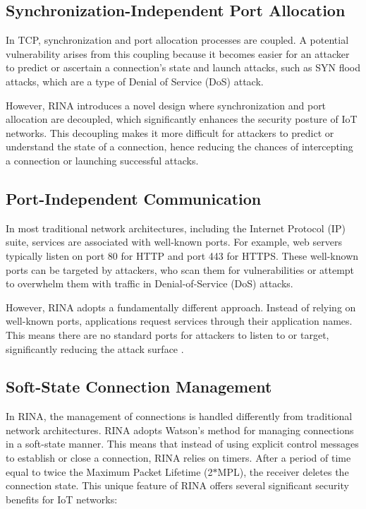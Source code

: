 \documentclass{ieeeaccess}
\begin{document}
\subsection{Synchronization-Independent Port Allocation}

In TCP, synchronization and port allocation processes are coupled. A potential vulnerability arises from this coupling because it becomes easier for an attacker to predict or ascertain a connection's state and launch attacks, such as SYN flood attacks, which are a type of Denial of Service (DoS) attack.

However, RINA introduces a novel design where synchronization and port allocation are decoupled, which significantly enhances the security posture of IoT networks. This decoupling makes it more difficult for attackers to predict or understand the state of a connection, hence reducing the chances of intercepting a connection or launching successful attacks.



\subsection{Port-Independent Communication}

In most traditional network architectures, including the Internet Protocol (IP) suite, services are associated with well-known ports. For example, web servers typically listen on port 80 for HTTP and port 443 for HTTPS. These well-known ports can be targeted by attackers, who scan them for vulnerabilities or attempt to overwhelm them with traffic in Denial-of-Service (DoS) attacks.

However, RINA adopts a fundamentally different approach. Instead of relying on well-known ports, applications request services through their application names. This means there are no standard ports for attackers to listen to or target, significantly reducing the attack surface \cite{small2012}.

\subsection{Soft-State Connection Management}

In RINA, the management of connections is handled differently from traditional network architectures. RINA adopts Watson's method for managing connections in a soft-state manner. This means that instead of using explicit control messages to establish or close a connection, RINA relies on timers. After a period of time equal to twice the Maximum Packet Lifetime (2$*$MPL), the receiver deletes the connection state. This unique feature of RINA offers several significant security benefits for IoT networks:
\end{document}
